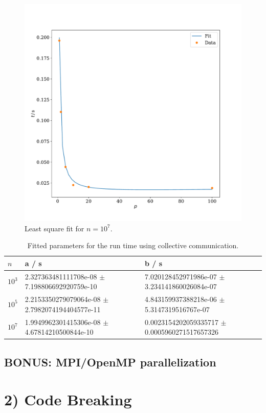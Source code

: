 \documentclass[a4paper, 11pt]{article}
\begin{document}
\begin{figure}
  \centering
  \includegraphics[width=\textwidth]{../trapezoid/plot/fit_10000000.pdf}
  \caption{Least square fit for $n=10^{7}$.}
  \label{fig:fit_10M}
\end{figure}
\begin{table}[ht]
\small
\begin{tabular}{lll}
$n$      & a / s                                          & b / s                 \\
\hline
$10^{3}$ & 2.327363481111708e-08 $\pm$ 7.198806692920759e-10 & 7.020128452971986e-07 $\pm$ 3.234141860026084e-07 \\
$10^{5}$ & 2.2153350279079064e-08 $\pm$ 2.7982074194404577e-11 & 4.843159937388218e-06 $\pm$ 5.3147319516767e-07 \\
$10^{7}$ & 1.9949962301415306e-08 $\pm$ 4.67814210500844e-10 & 0.0023154202059335717 $\pm$ 0.0005960271517657326 \\
\end{tabular}
\caption{Fitted parameters for the run time using collective communication.}
\label{tab:fit_paras}
\end{table}

\subsection*{BONUS: MPI/OpenMP parallelization}

\section*{2) Code Breaking}
\end{document}
